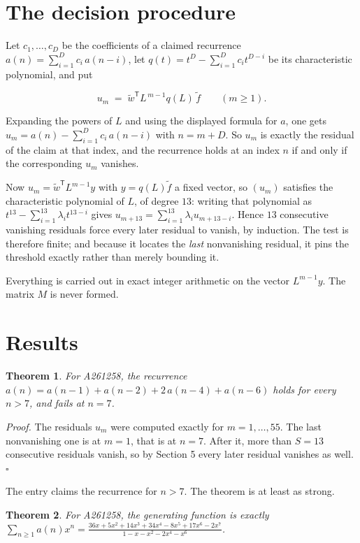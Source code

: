 \documentclass[11pt]{article}
\newtheorem{theorem}{Theorem}
\theoremstyle{definition}
\begin{document}
\section{The decision procedure}

Let $c_1,\dots,c_D$ be the coefficients of a claimed recurrence $a(n) = \sum_{i=1}^{D} c_i\,a(n-i)$, let $q(t) = t^{D} - \sum_{i=1}^{D} c_i t^{D-i}$ be its characteristic polynomial, and put

\[u_m \;=\; \tilde w^{\mathsf T} L^{\,m-1} q(L)\,\tilde f \qquad (m \ge 1).\]

Expanding the powers of $L$ and using the displayed formula for $a$, one gets $u_m = a(n) - \sum_{i=1}^{D} c_i\,a(n-i)$ with $n = m + D$. So $u_m$ is exactly the residual of the claim at that index, and the recurrence holds at an index $n$ if and only if the corresponding $u_m$ vanishes.

Now $u_m = \tilde w^{\mathsf T} L^{m-1} y$ with $y = q(L)\tilde f$ a fixed vector, so $(u_m)$ satisfies the characteristic polynomial of $L$, of degree $13$: writing that polynomial as $t^{13} - \sum_{i=1}^{13} \lambda_i t^{13-i}$ gives $u_{m+13} = \sum_{i=1}^{13} \lambda_i u_{m+13-i}$. Hence $13$ consecutive vanishing residuals force every later residual to vanish, by induction. The test is therefore finite; and because it locates the {\itshape last} nonvanishing residual, it pins the threshold exactly rather than merely bounding it.

Everything is carried out in exact integer arithmetic on the vector $L^{m-1}y$. The matrix $M$ is never formed.

\section{Results}

\begin{theorem} For A261258, the recurrence $a(n) = a(n-1) + a(n-2) + 2\,a(n-4) + a(n-6)$ holds for every $n > 7$, and fails at $n = 7$.\end{theorem}

{\itshape Proof.} The residuals $u_m$ were computed exactly for $m = 1,\dots,55$. The last nonvanishing one is at $m = 1$, that is at $n = 7$. After it, more than $S = 13$ consecutive residuals vanish, so by Section 5 every later residual vanishes as well. $\square$

The entry claims the recurrence for $n > 7$. The theorem is at least as strong.

\begin{theorem} For A261258, the generating function is exactly $\sum_{n\ge 1} a(n)x^n = \frac{36x + 5x^{2} + 14x^{3} + 34x^{4} - 8x^{5} + 17x^{6} - 2x^{7}}{1 - x - x^{2} - 2x^{4} - x^{6}}$.\end{theorem}
\end{document}
